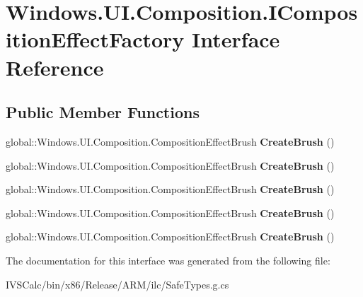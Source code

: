 \hypertarget{interface_windows_1_1_u_i_1_1_composition_1_1_i_composition_effect_factory}{}\section{Windows.\+U\+I.\+Composition.\+I\+Composition\+Effect\+Factory Interface Reference}
\label{interface_windows_1_1_u_i_1_1_composition_1_1_i_composition_effect_factory}
\subsection*{Public Member Functions}
\begin{DoxyCompactItemize}
\item 
\mbox{\label{interface_windows_1_1_u_i_1_1_composition_1_1_i_composition_effect_factory_a7c805eaa187f163651cefa751e5c4059}} 
global\+::\+Windows.\+U\+I.\+Composition.\+Composition\+Effect\+Brush {\bfseries Create\+Brush} ()
\item 
\mbox{\label{interface_windows_1_1_u_i_1_1_composition_1_1_i_composition_effect_factory_a7c805eaa187f163651cefa751e5c4059}} 
global\+::\+Windows.\+U\+I.\+Composition.\+Composition\+Effect\+Brush {\bfseries Create\+Brush} ()
\item 
\mbox{\label{interface_windows_1_1_u_i_1_1_composition_1_1_i_composition_effect_factory_a7c805eaa187f163651cefa751e5c4059}} 
global\+::\+Windows.\+U\+I.\+Composition.\+Composition\+Effect\+Brush {\bfseries Create\+Brush} ()
\item 
\mbox{\label{interface_windows_1_1_u_i_1_1_composition_1_1_i_composition_effect_factory_a7c805eaa187f163651cefa751e5c4059}} 
global\+::\+Windows.\+U\+I.\+Composition.\+Composition\+Effect\+Brush {\bfseries Create\+Brush} ()
\item 
\mbox{\label{interface_windows_1_1_u_i_1_1_composition_1_1_i_composition_effect_factory_a7c805eaa187f163651cefa751e5c4059}} 
global\+::\+Windows.\+U\+I.\+Composition.\+Composition\+Effect\+Brush {\bfseries Create\+Brush} ()
\end{DoxyCompactItemize}


The documentation for this interface was generated from the following file\+:\begin{DoxyCompactItemize}
\item 
I\+V\+S\+Calc/bin/x86/\+Release/\+A\+R\+M/ilc/Safe\+Types.\+g.\+cs\end{DoxyCompactItemize}
